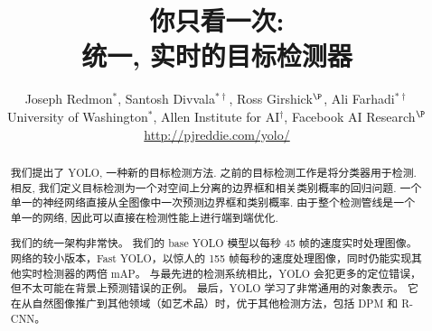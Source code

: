 \documentclass[10pt,twocolumn,letterpaper]{article}
\begin{document}
\title{\vspace{-1cm}你只看一次: \\
统一, 实时的目标检测器\vspace{-.25cm}}



\author{Joseph Redmon$^*$, Santosh Divvala$^{* \dag}$, Ross Girshick$^\P$, Ali Farhadi$^{* \dag}$\\
\small{University of Washington$^*$, Allen Institute for AI$^\dag$, Facebook AI Research$^\P$}\\ \url{http://pjreddie.com/yolo/}}

\maketitle

\begin{abstract}
\vspace{-.25cm}
我们提出了 YOLO, 一种新的目标检测方法. 之前的目标检测工作是将分类器用于检测. 相反, 我们定义目标检测为一个对空间上分离的边界框和相关类别概率的回归问题. 一个单一的神经网络直接从全图像中一次预测边界框和类别概率. 由于整个检测管线是一个单一的网络, 因此可以直接在检测性能上进行端到端优化.

我们的统一架构非常快。 我们的 base YOLO 模型以每秒 45 帧的速度实时处理图像。 网络的较小版本，Fast YOLO，以惊人的 155 帧每秒的速度处理图像，同时仍能实现其他实时检测器的两倍 mAP。 与最先进的检测系统相比，YOLO 会犯更多的定位错误，但不太可能在背景上预测错误的正例。 最后，YOLO 学习了非常通用的对象表示。 它在从自然图像推广到其他领域（如艺术品）时，优于其他检测方法，包括 DPM 和 R-CNN。

\end{abstract}
\end{document}
